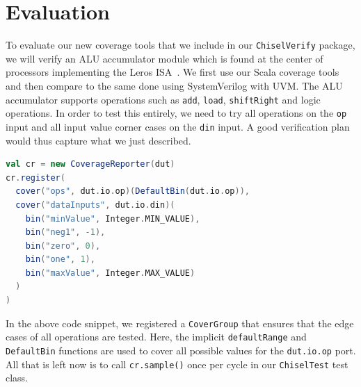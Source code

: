 \documentclass[conference]{IEEEtran}
\newcommand{\todo}[1]{{\color{olive} TODO: #1}}
\newcommand{\martin}[1]{{\color{blue} Martin: #1}}
\newcommand{\hjd}[1]{{\color{pink} Hans: #1}}
\begin{document}
\section{Evaluation}
To evaluate our new coverage tools that we include in our \texttt{ChiselVerify} package, we will verify an ALU accumulator module which is found at the center of processors implementing the Leros ISA~\cite{leros:arcs2019}. We first use our Scala coverage tools and then compare to the same done using SystemVerilog with UVM. %
 The ALU accumulator supports operations such as \texttt{add}, \texttt{load}, \texttt{shiftRight} and logic operations. %
 In order to test this entirely, we need to try all operations on the \texttt{op} input and all input value corner cases on the \texttt{din} input. %
 A good verification plan would thus capture what we just described.  
\begin{lstlisting}[language=scala] 
val cr = new CoverageReporter(dut)  
cr.register(
  cover("ops", dut.io.op)(DefaultBin(dut.io.op)),
  cover("dataInputs", dut.io.din)(
    bin("minValue", Integer.MIN_VALUE),
    bin("neg1", -1),
    bin("zero", 0),
    bin("one", 1),
    bin("maxValue", Integer.MAX_VALUE)
  )
)
\end{lstlisting}
In the above code snippet, we registered a \texttt{CoverGroup} that ensures that the edge cases of all operations are tested.
Here, the implicit \texttt{defaultRange} and \texttt{DefaultBin} functions are used to cover all possible values for the \texttt{dut.io.op} port.
All that is left now is to call \texttt{cr.sample()} once per cycle in our \texttt{ChiselTest} test class.
\end{document}
